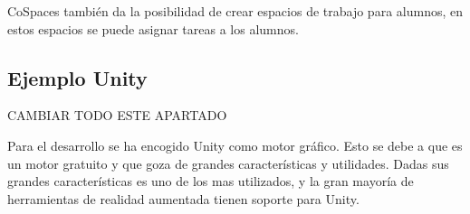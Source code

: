 CoSpaces también da la posibilidad de crear espacios de trabajo para alumnos, en estos espacios se puede asignar tareas a los alumnos.


\subsection{Ejemplo Unity}
CAMBIAR TODO ESTE APARTADO

Para el desarrollo se ha encogido Unity como motor gráfico. Esto se debe a que es un motor gratuito y que goza de grandes características y utilidades. Dadas sus grandes características es uno de los mas utilizados, y la gran mayoría de herramientas de realidad aumentada tienen soporte para Unity.




